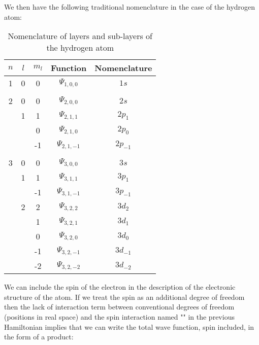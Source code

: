 	We then have the following traditional nomenclature in the case of the hydrogen atom:
	\begin{table}[H]
	\begin{center}
			\begin{tabular}{|c|c|c|c|c|}
				\hline
				\multicolumn{1}{c}{\cellcolor[gray]{0.75}\textbf{$n$}} & 
  \multicolumn{1}{c}{\cellcolor[gray]{0.75}\textbf{$l$}} & 
  \multicolumn{1}{c}{\cellcolor[gray]{0.75}\textbf{$m_l$}}  & 
  \multicolumn{1}{c}{\cellcolor[gray]{0.75}Function} & 
  \multicolumn{1}{c}{\cellcolor[gray]{0.75}Nomenclature}\\ \hline
				1 & 0 & 0 & $\Psi_{1,0,0}$ & $1s$\\ \hline
				   &  &  &  & \\ \hline
				2 & 0 & 0 & $\Psi_{2,0,0}$ & $2s$\\ \hline
				   & 1 & 1 & $\Psi_{2,1,1}$ & $2p_1$\\ \hline
				   &   & 0 & $\Psi_{2,1,0}$ & $2p_0$\\ \hline
				   &   & -1 & $\Psi_{2,1,-1}$ & $2p_{-1}$\\ \hline
				   &  &  &  & \\ \hline
				3 & 0 & 0 & $\Psi_{3,0,0}$ & $3s$\\ \hline
				   & 1 & 1 & $\Psi_{3,1,1}$ & $3p_1$\\ \hline
				   &   & -1 & $\Psi_{3,1,-1}$ & $3p_{-1}$\\ \hline
				   &  2 & 2 & $\Psi_{3,2,2}$ & $3d_2$\\ \hline
				   &     & 1 & $\Psi_{3,2,1}$ & $3d_1$\\ \hline
				   &     & 0 & $\Psi_{3,2,0}$ & $3d_0$\\ \hline
				   &     & -1 & $\Psi_{3,2,-1}$ & $3d_{-1}$\\ \hline
				   &     & -2 & $\Psi_{3,2,-2}$ & $3d_{-2}$\\ \hline

		\end{tabular}
	\end{center}
	\caption{Nomenclature of layers and sub-layers of the hydrogen atom}
	\end{table}
	We can include the spin of the electron in the description of the electronic structure of the atom. If we treat the spin as an additional degree of freedom then the lack of interaction term between conventional degrees of freedom (positions in real space) and the spin interaction named "" in the previous Hamiltonian implies that we can write the total wave function, spin included, in the form of a product:
	
